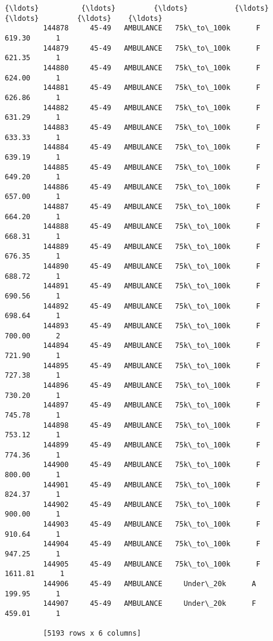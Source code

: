 \documentclass[11pt]{article}
\begin{document}
\begin{Verbatim}[commandchars=\\\{\}]
         {\ldots}          {\ldots}         {\ldots}           {\ldots}    {\ldots}         {\ldots}    {\ldots}
         144878     45-49   AMBULANCE   75k\_to\_100k      F      619.30      1
         144879     45-49   AMBULANCE   75k\_to\_100k      F      621.35      1
         144880     45-49   AMBULANCE   75k\_to\_100k      F      624.00      1
         144881     45-49   AMBULANCE   75k\_to\_100k      F      626.86      1
         144882     45-49   AMBULANCE   75k\_to\_100k      F      631.29      1
         144883     45-49   AMBULANCE   75k\_to\_100k      F      633.33      1
         144884     45-49   AMBULANCE   75k\_to\_100k      F      639.19      1
         144885     45-49   AMBULANCE   75k\_to\_100k      F      649.20      1
         144886     45-49   AMBULANCE   75k\_to\_100k      F      657.00      1
         144887     45-49   AMBULANCE   75k\_to\_100k      F      664.20      1
         144888     45-49   AMBULANCE   75k\_to\_100k      F      668.31      1
         144889     45-49   AMBULANCE   75k\_to\_100k      F      676.35      1
         144890     45-49   AMBULANCE   75k\_to\_100k      F      688.72      1
         144891     45-49   AMBULANCE   75k\_to\_100k      F      690.56      1
         144892     45-49   AMBULANCE   75k\_to\_100k      F      698.64      1
         144893     45-49   AMBULANCE   75k\_to\_100k      F      700.00      2
         144894     45-49   AMBULANCE   75k\_to\_100k      F      721.90      1
         144895     45-49   AMBULANCE   75k\_to\_100k      F      727.38      1
         144896     45-49   AMBULANCE   75k\_to\_100k      F      730.20      1
         144897     45-49   AMBULANCE   75k\_to\_100k      F      745.78      1
         144898     45-49   AMBULANCE   75k\_to\_100k      F      753.12      1
         144899     45-49   AMBULANCE   75k\_to\_100k      F      774.36      1
         144900     45-49   AMBULANCE   75k\_to\_100k      F      800.00      1
         144901     45-49   AMBULANCE   75k\_to\_100k      F      824.37      1
         144902     45-49   AMBULANCE   75k\_to\_100k      F      900.00      1
         144903     45-49   AMBULANCE   75k\_to\_100k      F      910.64      1
         144904     45-49   AMBULANCE   75k\_to\_100k      F      947.25      1
         144905     45-49   AMBULANCE   75k\_to\_100k      F     1611.81      1
         144906     45-49   AMBULANCE     Under\_20k      A      199.95      1
         144907     45-49   AMBULANCE     Under\_20k      F      459.01      1
         
         [5193 rows x 6 columns]
\end{Verbatim}
            
\end{document}
